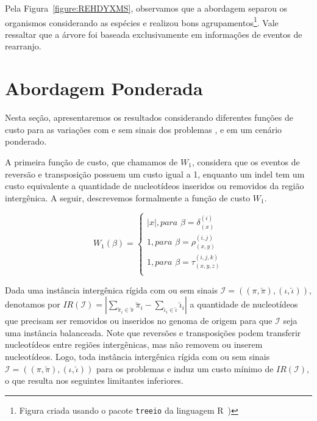 Pela Figura~\ref{figure:REHDYXMS}, observamos que a abordagem separou os organismos considerando as espécies e realizou bons agrupamentos\footnote{Figura criada usando o pacote \texttt{treeio} da linguagem R~\cite{wang2020treeio})}. Vale ressaltar que a árvore foi baseada exclusivamente em informações de eventos de rearranjo.

\pagebreak

\section{Abordagem Ponderada}

Nesta seção, apresentaremos os resultados considerando diferentes funções de custo para as variações com e sem sinais dos problemas \SbWIRI{}, \SbWIRTI{} e \SbWIRT{} em um cenário ponderado.

A primeira função de custo, que chamamos de $W_1$, considera que os eventos de reversão e transposição possuem um custo igual a 1, enquanto um indel tem um custo equivalente a quantidade de nucleotídeos inseridos ou removidos da região intergênica. A seguir, descrevemos formalmente a função de custo $W_1$.

$$
  W_1(\beta) = \begin{cases}
      |x|, \textit{para } \beta = \delta_{(x)}^{(i)} \\
      1, \textit{para } \beta = \rho_{(x,y)}^{(i,j)} \\
      1, \textit{para } \beta = \tau_{(x,y,z)}^{(i,j,k)} \\
  \end{cases}
$$

Dada uma instância intergênica rígida com ou sem sinais $\mathcal{I}=((\pi,\breve\pi),(\iota,\breve\iota))$, denotamos por $IR(\mathcal{I}) = |\sum_{\breve\pi_i \in \breve\pi} \breve\pi_i - \sum_{\breve\iota_i \in \breve\iota} \breve\iota_i|$ a quantidade de nucleotídeos que precisam ser removidos ou inseridos no genoma de origem para que $\mathcal{I}$ seja uma instância balanceada. Note que reversões e transposições podem transferir nucleotídeos entre regiões intergênicas, mas não removem ou inserem nucleotídeos. Logo, toda instância intergênica rígida com ou sem sinais $\mathcal{I}=((\pi,\breve\pi),(\iota,\breve\iota))$ para os problemas \SbWIRI{} e \SbWIRTI{} induz um custo mínimo de $IR(\mathcal{I})$, o que resulta nos seguintes limitantes inferiores.

